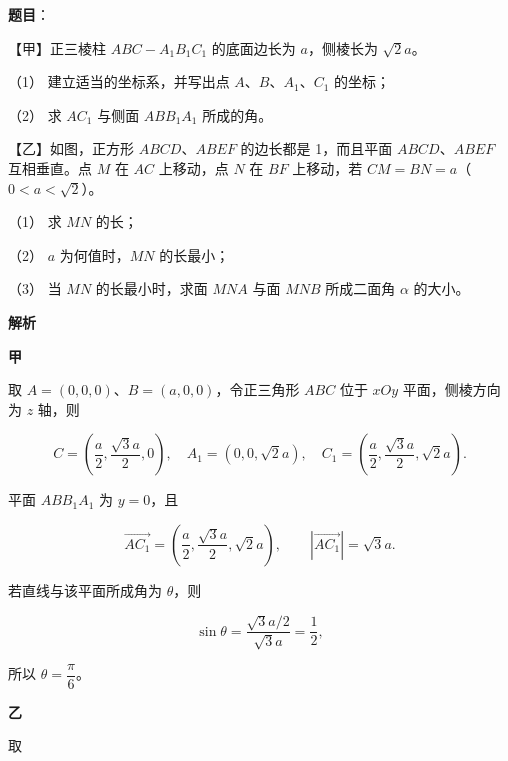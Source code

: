 \begin{answer}

\textbf{题目}：

【甲】正三棱柱 $ABC-A_1B_1C_1$ 的底面边长为 $a$，侧棱长为 $\sqrt2a$。
\nopagebreak[4]
\begin{center}\end{center}
\nopagebreak[4]
（1） 建立适当的坐标系，并写出点 $A\text{、}B\text{、}A_1\text{、}C_1$ 的坐标；

（2） 求 $AC_1$ 与侧面 $ABB_1A_1$ 所成的角。

【乙】如图，正方形 $ABCD\text{、}ABEF$ 的边长都是 1，而且平面 $ABCD\text{、}ABEF$ 互相垂直。点 $M$ 在 $AC$ 上移动，点 $N$ 在 $BF$ 上移动，若 $CM=BN=a$（$0<a<\sqrt2$）。
\nopagebreak[4]
\begin{center}\end{center}
\nopagebreak[4]
（1） 求 $MN$ 的长；

（2） $a$ 为何值时，$MN$ 的长最小；

（3） 当 $MN$ 的长最小时，求面 $MNA$ 与面 $MNB$ 所成二面角 $\alpha$ 的大小。


\textbf{解析}

\textbf{甲}


取 $A=(0,0,0)$、$B=(a,0,0)$，令正三角形 $ABC$ 位于 $xOy$ 平面，侧棱方向为 $z$ 轴，则

\nopagebreak[4]
\[
C=\left(\frac a2,\frac{\sqrt3a}{2},0\right),\quad
A_1=(0,0,\sqrt2a),\quad
C_1=\left(\frac a2,\frac{\sqrt3a}{2},\sqrt2a\right).
\]


平面 $ABB_1A_1$ 为 $y=0$，且

\nopagebreak[4]
\[
\overrightarrow{AC_1}
=\left(\frac a2,\frac{\sqrt3a}{2},\sqrt2a\right),\qquad
|\overrightarrow{AC_1}|=\sqrt3a.
\]

若直线与该平面所成角为 $\theta$，则

\nopagebreak[4]
\[
\sin\theta=\frac{\sqrt3a/2}{\sqrt3a}=\frac12,
\]

所以 $\theta=\dfrac\pi6$。

\textbf{乙}


取


\end{answer}
